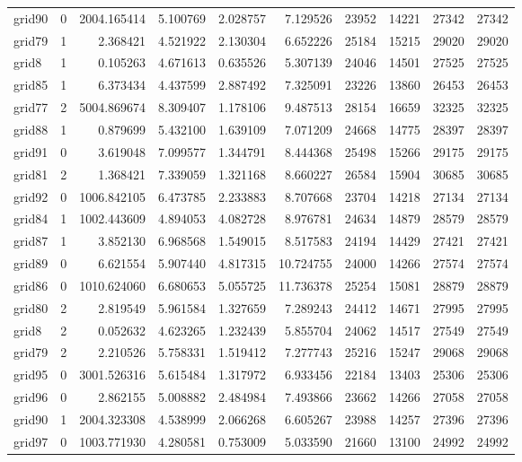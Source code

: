 \begin{longtable}{|l|r|r|r|r|r|r|r|r|r|}
grid90 & 0 & 2004.165414 & 5.100769 & 2.028757 & 7.129526 & 23952 & 14221 & 27342 & 27342 \\
grid79 & 1 & 2.368421 & 4.521922 & 2.130304 & 6.652226 & 25184 & 15215 & 29020 & 29020 \\
grid8 & 1 & 0.105263 & 4.671613 & 0.635526 & 5.307139 & 24046 & 14501 & 27525 & 27525 \\
grid85 & 1 & 6.373434 & 4.437599 & 2.887492 & 7.325091 & 23226 & 13860 & 26453 & 26453 \\
grid77 & 2 & 5004.869674 & 8.309407 & 1.178106 & 9.487513 & 28154 & 16659 & 32325 & 32325 \\
grid88 & 1 & 0.879699 & 5.432100 & 1.639109 & 7.071209 & 24668 & 14775 & 28397 & 28397 \\
grid91 & 0 & 3.619048 & 7.099577 & 1.344791 & 8.444368 & 25498 & 15266 & 29175 & 29175 \\
grid81 & 2 & 1.368421 & 7.339059 & 1.321168 & 8.660227 & 26584 & 15904 & 30685 & 30685 \\
grid92 & 0 & 1006.842105 & 6.473785 & 2.233883 & 8.707668 & 23704 & 14218 & 27134 & 27134 \\
grid84 & 1 & 1002.443609 & 4.894053 & 4.082728 & 8.976781 & 24634 & 14879 & 28579 & 28579 \\
grid87 & 1 & 3.852130 & 6.968568 & 1.549015 & 8.517583 & 24194 & 14429 & 27421 & 27421 \\
grid89 & 0 & 6.621554 & 5.907440 & 4.817315 & 10.724755 & 24000 & 14266 & 27574 & 27574 \\
grid86 & 0 & 1010.624060 & 6.680653 & 5.055725 & 11.736378 & 25254 & 15081 & 28879 & 28879 \\
grid80 & 2 & 2.819549 & 5.961584 & 1.327659 & 7.289243 & 24412 & 14671 & 27995 & 27995 \\
grid8 & 2 & 0.052632 & 4.623265 & 1.232439 & 5.855704 & 24062 & 14517 & 27549 & 27549 \\
grid79 & 2 & 2.210526 & 5.758331 & 1.519412 & 7.277743 & 25216 & 15247 & 29068 & 29068 \\
grid95 & 0 & 3001.526316 & 5.615484 & 1.317972 & 6.933456 & 22184 & 13403 & 25306 & 25306 \\
grid96 & 0 & 2.862155 & 5.008882 & 2.484984 & 7.493866 & 23662 & 14266 & 27058 & 27058 \\
grid90 & 1 & 2004.323308 & 4.538999 & 2.066268 & 6.605267 & 23988 & 14257 & 27396 & 27396 \\
grid97 & 0 & 1003.771930 & 4.280581 & 0.753009 & 5.033590 & 21660 & 13100 & 24992 & 24992 \\

\end{longtable}
